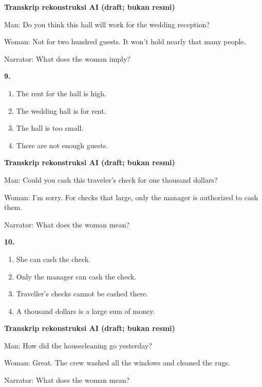 \documentclass[12pt]{article}
\begin{document}
\par
\vspace{0.25\baselineskip}
\begin{exampleblock}
\textbf{Transkrip rekonstruksi AI (draft; bukan resmi)}\par
Man: Do you think this hall will work for the wedding reception?\par
Woman: Not for two hundred guests. It won't hold nearly that many people.\par
Narrator: What does the woman imply?\par
\end{exampleblock}
\noindent\textbf{9.}
\begin{enumerate}[label=(\Alph*),leftmargin=*,itemsep=0.2em]
\item The rent for the hall is high.
\item The wedding hall is for rent.
\item The hall is too small.
\item There are not enough guests.
\end{enumerate}
\par
\vspace{0.25\baselineskip}
\begin{exampleblock}
\textbf{Transkrip rekonstruksi AI (draft; bukan resmi)}\par
Man: Could you cash this traveler's check for one thousand dollars?\par
Woman: I'm sorry. For checks that large, only the manager is authorized to cash them.\par
Narrator: What does the woman mean?\par
\end{exampleblock}
\noindent\textbf{10.}
\begin{enumerate}[label=(\Alph*),leftmargin=*,itemsep=0.2em]
\item She can cash the check.
\item Only the manager can cash the check.
\item Traveller's checks cannot be cashed there.
\item A thousand dollars is a large sum of money.
\end{enumerate}
\par
\vspace{0.25\baselineskip}
\begin{exampleblock}
\textbf{Transkrip rekonstruksi AI (draft; bukan resmi)}\par
Man: How did the housecleaning go yesterday?\par
Woman: Great. The crew washed all the windows and cleaned the rugs.\par
Narrator: What does the woman mean?\par
\end{exampleblock}
\end{document}

